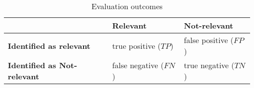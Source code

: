 \begin{table}[H]
\centering    
\begin{scriptsize}
\begin{threeparttable}
\begin{tabular}{l|l|l}

\hline

\textbf{}
& \textbf{Relevant}    
& \textbf{Not-relevant} \\

\hline

\textbf{Identified as relevant} & true positive ($TP$) & false positive ($FP$) \\
\hline
\textbf{Identified as Not-relevant} & false negative ($FN$) & true negative ($TN$) \\
\hline

\end{tabular}
\end{threeparttable}
\end{scriptsize}
\caption{Evaluation outcomes}
\label{tbl:type-I-II-errors}
\end{table}

    